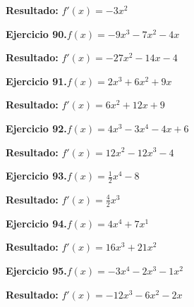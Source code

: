 \documentclass[10pt,a4paper]{article}
\begin{document}
\begin{solbox}
\textbf{Resultado:} \(\displaystyle f'(x) = -3x^{2}\)
\end{solbox}

\begin{ejbox}
\textbf{Ejercicio 90.}\quad $f(x) = -9x^{3} -7x^2 -4x$
\end{ejbox}

\begin{solbox}
\textbf{Resultado:} \(\displaystyle f'(x) = -27x^{2} -14x -4\)
\end{solbox}

\newpage
\begin{ejbox}
\textbf{Ejercicio 91.}\quad $f(x) = 2x^3 +6x^2 +9x$
\end{ejbox}

\begin{solbox}
\textbf{Resultado:} \(\displaystyle f'(x) = 6x^2 +12x +9\)
\end{solbox}

\begin{ejbox}
\textbf{Ejercicio 92.}\quad $f(x) = 4x^{3} -3x^{4} -4x +6$
\end{ejbox}

\begin{solbox}
\textbf{Resultado:} \(\displaystyle f'(x) = 12x^{2} -12x^{3} -4\)
\end{solbox}

\begin{ejbox}
\textbf{Ejercicio 93.}\quad $f(x) = \frac{1}{2}x^{4} -8$
\end{ejbox}

\begin{solbox}
\textbf{Resultado:} \(\displaystyle f'(x) = \frac{4}{2}x^{3}\)
\end{solbox}

\newpage
\begin{ejbox}
\textbf{Ejercicio 94.}\quad $f(x) = 4x^{4} + 7x^{1}$
\end{ejbox}

\begin{solbox}
\textbf{Resultado:} \(\displaystyle f'(x) = 16x^{3} + 21x^{2}\)
\end{solbox}

\begin{ejbox}
\textbf{Ejercicio 95.}\quad $f(x) = -3x^4 -2x^3 -1x^2$
\end{ejbox}

\begin{solbox}
\textbf{Resultado:} \(\displaystyle f'(x) = -12x^3 -6x^2 -2x\)
\end{solbox}
\end{document}
